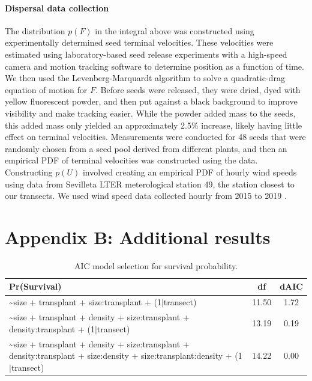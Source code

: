 \documentclass[11pt]{article}\usepackage[]{graphicx}\usepackage[usenames,dvipsnames]{xcolor}
\begin{document}
\paragraph{Dispersal data collection}
The distribution $p(F)$ in the integral above was constructed using experimentally determined seed terminal velocities.
These velocities were estimated using laboratory-based seed release experiments with a high-speed camera and motion tracking software to determine position as a function of time.
We then used the Levenberg-Marquardt algorithm to solve a quadratic-drag equation of motion for $F$. 
Before seeds were released, they were dried, dyed with yellow fluorescent powder, and then put against a black background to improve visibility and make tracking easier.
While the powder added mass to the seeds, this added mass only yielded an approximately 2.5\% increase, likely having little effect on terminal velocities.
Measurements were conducted for 48 seeds that were randomly chosen from a seed pool derived from different plants, and then an empirical PDF of terminal velocities was constructed using the data.
Constructing $p(U)$ involved creating an empirical PDF of hourly wind speeds using data from Sevilleta LTER meterological station 49, the station closest to our transects.
We used wind speed data collected hourly from 2015 to 2019 \citep{SEVmet}.

\newpage
\section*{Appendix B: Additional results}
\renewcommand{\thefigure}{B\arabic{figure}}\setcounter{figure}{0}
\renewcommand{\thetable}{B\arabic{table}}\setcounter{table}{0}
\renewcommand{\theequation}{B\arabic{equation}}\setcounter{equation}{0}

\begin{table}[ht]
\centering
\begin{tabular}{|p{12cm}|c|c|}
  \hline
Pr(Survival) & df & dAIC \\ 
  \hline
\~{}size + transplant + size:transplant + (1$|$transect) & 11.50 & 1.72 \\ 
  \~{}size + transplant + density + size:transplant + density:transplant + (1$|$transect) & 13.19 & 0.19 \\ 
  \~{}size + transplant + density + size:transplant + density:transplant + size:density + size:transplant:density + (1$|$transect) & 14.22 & 0.00 \\ 
   \hline
\end{tabular}
\caption{AIC model selection for survival probability.} 
\label{tab:surv_aic}
\end{table}
\end{document}
